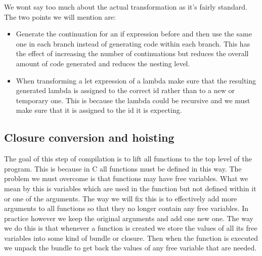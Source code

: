 \documentclass[a4paper]{article}
\begin{document}
We wont say too much about the actual transformation as it's fairly standard. The two points we will mention are:
\begin{itemize}
\item
	Generate the continuation for an if expression before and then use the same one in each branch instead of generating code within each branch. This has the effect of increasing the number of continuations but reduces the overall amount of code generated and reduces the nesting level.

\item
	When transforming a let expression of a lambda make sure that the resulting generated lambda is assigned to the correct id rather than to a new or temporary one. This is because the lambda could be recursive and we must make sure that it is assigned to the id it is expecting. 

\end{itemize}




\subsection{Closure conversion and hoisting}

The goal of this step of compilation is to lift all functions to the top level of the program. This is because in C all functions must be defined in this way. The problem we must overcome is that functions may have free variables. What we mean by this is variables which are used in the function but not defined within it or one of the arguments. The way we will fix this is to effectively add more arguments to all functions so that they no longer contain any free variables. In practice however we keep the original arguments and add one new one. The way we do this is that whenever a function is created we store the values of all its free variables into some kind of bundle or closure. Then when the function is executed we unpack the bundle to get back the values of any free variable that are needed.
\end{document}
